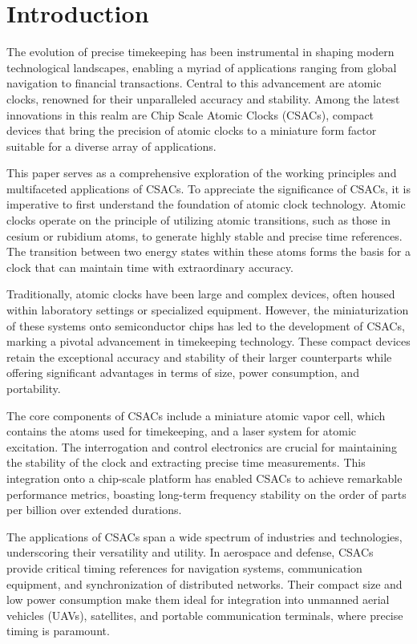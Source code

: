 \section{Introduction}
\label{sec:introduction}

The evolution of precise timekeeping has been instrumental in shaping modern technological landscapes, enabling a myriad of applications ranging from global navigation to financial transactions.
Central to this advancement are atomic clocks, renowned for their unparalleled accuracy and stability.
Among the latest innovations in this realm are Chip Scale Atomic Clocks (CSACs), compact devices that bring the precision of atomic clocks to a miniature form factor suitable for a diverse array of applications.

This paper serves as a comprehensive exploration of the working principles and multifaceted applications of CSACs.
To appreciate the significance of CSACs, it is imperative to first understand the foundation of atomic clock technology.
Atomic clocks operate on the principle of utilizing atomic transitions, such as those in cesium or rubidium atoms, to generate highly stable and precise time references.
The transition between two energy states within these atoms forms the basis for a clock that can maintain time with extraordinary accuracy.

Traditionally, atomic clocks have been large and complex devices, often housed within laboratory settings or specialized equipment.
However, the miniaturization of these systems onto semiconductor chips has led to the development of CSACs, marking a pivotal advancement in timekeeping technology.
These compact devices retain the exceptional accuracy and stability of their larger counterparts while offering significant advantages in terms of size, power consumption, and portability.

The core components of CSACs include a miniature atomic vapor cell, which contains the atoms used for timekeeping, and a laser system for atomic excitation.
The interrogation and control electronics are crucial for maintaining the stability of the clock and extracting precise time measurements.
This integration onto a chip-scale platform has enabled CSACs to achieve remarkable performance metrics, boasting long-term frequency stability on the order of parts per billion over extended durations.

The applications of CSACs span a wide spectrum of industries and technologies, underscoring their versatility and utility.
In aerospace and defense, CSACs provide critical timing references for navigation systems, communication equipment, and synchronization of distributed networks.
Their compact size and low power consumption make them ideal for integration into unmanned aerial vehicles (UAVs), satellites, and portable communication terminals, where precise timing is paramount.

